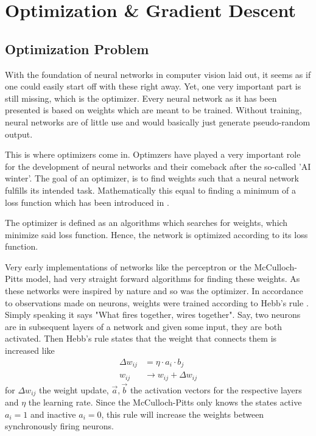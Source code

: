 \setchapterpreamble[u]{\margintoc}
\chapter{Optimization \& Gradient Descent}

\section{Optimization Problem}
With the foundation of neural networks in computer vision laid out, it seems as if one could easily start off with these right away.
Yet, one very important part is still missing, which is the optimizer.
Every neural network as it has been presented is based on weights which are meant to be trained.
Without training, neural networks are of little use and would basically just generate pseudo-random output.

This is where optimizers come in.
Optimzers have played a very important role for the development of neural networks and their comeback after the so-called 'AI winter'.
The goal of an optimizer, is to find weights such that a neural network fulfills its intended task.
Mathematically this equal to finding a minimum of a loss function which has been introduced in .

The optimizer is defined as an algorithms which searches for weights, which minimize said loss function.
Hence, the network is optimized according to its loss function.

Very early implementations of networks like the perceptron or the McCulloch-Pitts model, had very straight forward algorithms for finding these weights.
As these networks were inspired by nature and so was the optimizer.
In accordance to observations made on neurons, weights were trained according to Hebb's rule \cite{ommer}.
Simply speaking it says "What fires together, wires together"\cite{hebb}.
Say, two neurons are in subsequent layers of a network and given some input, they are both activated.
Then Hebb's rule states that the weight that connects them is increased like
\begin{align}
    \Delta w_{ij} & = \eta \cdot a_i \cdot b_j \\
    w_{ij} & \rightarrow w_{ij} + \Delta w_{ij}
\end{align}
for $\Delta w_{ij}$ the weight update, $\vec{a}, \vec{b}$ the activation vectors for the respective layers and $\eta$ the learning rate.
Since the McCulloch-Pitts only knows the states active $a_i = 1$ and inactive $a_i = 0$, this rule will increase the weights between synchronously firing neurons.

